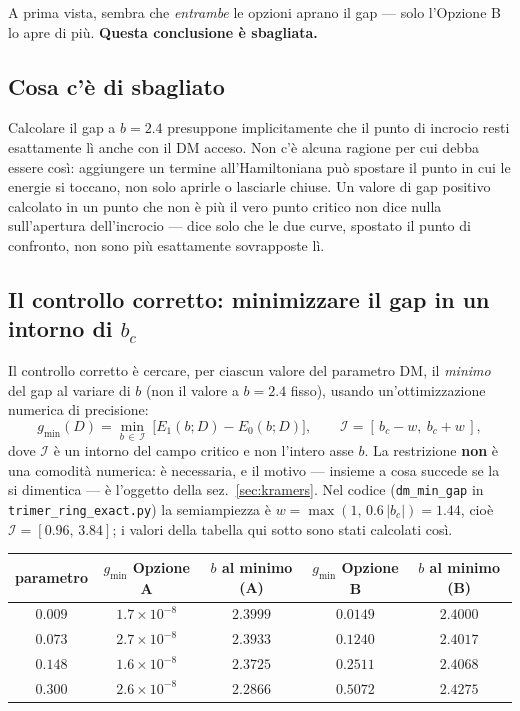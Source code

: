 \documentclass[11pt,a4paper]{article}
\theoremstyle{remark}
\begin{document}
A prima vista, sembra che \emph{entrambe} le opzioni aprano il gap — solo l'Opzione B
lo apre di più. \textbf{Questa conclusione è sbagliata.}

\subsection{Cosa c'è di sbagliato}

Calcolare il gap a $b=2.4$ presuppone implicitamente che il punto di incrocio resti
esattamente lì anche con il DM acceso. Non c'è alcuna ragione per cui debba essere
così: aggiungere un termine all'Hamiltoniana può spostare il punto in cui le energie
si toccano, non solo aprirle o lasciarle chiuse. Un valore di gap positivo calcolato
in un punto che non è più il vero punto critico non dice nulla sull'apertura
dell'incrocio — dice solo che le due curve, spostato il punto di confronto, non sono
più esattamente sovrapposte lì.

\subsection{Il controllo corretto: minimizzare il gap in un intorno di $b_c$}

Il controllo corretto è cercare, per ciascun valore del parametro DM, il \emph{minimo}
del gap al variare di $b$ (non il valore a $b=2.4$ fisso), usando un'ottimizzazione
numerica di precisione:
\[
g_\text{min}(D) = \min_{b\,\in\,\mathcal{I}}\ \big[E_1(b;D) - E_0(b;D)\big],
\qquad \mathcal{I} = [\,b_c - w,\ b_c + w\,],
\]
dove $\mathcal{I}$ è un intorno del campo critico e non l'intero asse $b$. La
restrizione \textbf{non} è una comodità numerica: è necessaria, e il motivo —
insieme a cosa succede se la si dimentica — è l'oggetto della
sez.~\ref{sec:kramers}. Nel codice (\texttt{dm\_min\_gap} in
\texttt{trimer\_ring\_exact.py}) la semiampiezza è
$w=\max(1,\,0.6\,|b_c|)=1.44$, cioè $\mathcal{I}=[0.96,\,3.84]$; i valori della
tabella qui sotto sono stati calcolati così.

\label{sec:gmin-tabella}
\begin{center}
\renewcommand{\arraystretch}{1.3}
\begin{tabular}{ccccc}
\toprule
parametro & $g_\text{min}$ Opzione A & $b$ al minimo (A) & $g_\text{min}$ Opzione B & $b$ al minimo (B) \\
\midrule
$0.009$ & $1.7\times10^{-8}$ & $2.3999$ & $0.0149$ & $2.4000$ \\
$0.073$ & $2.7\times10^{-8}$ & $2.3933$ & $0.1240$ & $2.4017$ \\
$0.148$ & $1.6\times10^{-8}$ & $2.3725$ & $0.2511$ & $2.4068$ \\
$0.300$ & $2.6\times10^{-8}$ & $2.2866$ & $0.5072$ & $2.4275$ \\
\bottomrule
\end{tabular}
\end{center}
\end{document}
